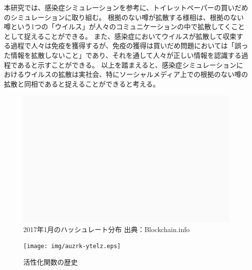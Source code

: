 本研究では、感染症シミュレーションを参考に、トイレットペーパーの買いだめのシミュレーションに取り組む。
根拠のない噂が拡散する様相は、根拠のない噂という1つの「ウイルス」が人々のコミュニケーションの中で拡散してくこととして捉えることができる。
また、感染症においてウイルスが拡散して収束する過程で人々は免疫を獲得するが、免疫の獲得は買いだめ問題においては「誤った情報を拡散しないこと」であり、それを通して人々が正しい情報を認識する過程であると示すことができる。
以上を踏まえると、感染症シミュレーションにおけるウイルスの拡散は実社会、特にソーシャルメディア上での根拠のない噂の拡散と同相であると捉えることができると考える。



\begin{figure}[h]
    \begin{center}
        \includegraphics[wisth=15cm]{img/hashrate.png}
        \caption{2017年1月のハッシュレート分布 出典：Blockchain.info\cite{bitcoinhashrate}}
        \label{img:hashrate}
    \end{center}
\end{figure}


\begin{figure}[hbtp]
\texttt{[image: img/auzrk-ytelz.eps]}
	\caption{活性化関数の歴史}
	\label{history_af}
\end{figure}
\fi
